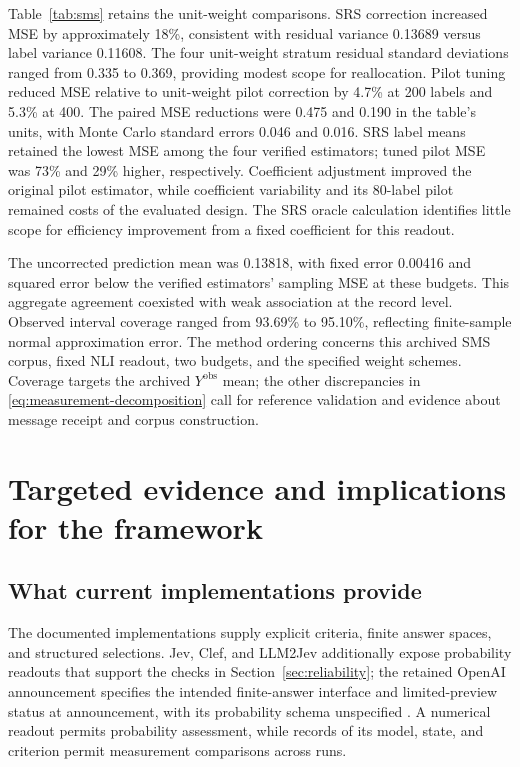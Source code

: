 \documentclass[11pt,a4paper]{article}
\begin{document}
Table~\ref{tab:sms} retains the unit-weight comparisons. SRS correction increased MSE by approximately 18\%, consistent with residual variance 0.13689 versus label variance 0.11608. The four unit-weight stratum residual standard deviations ranged from 0.335 to 0.369, providing modest scope for reallocation. Pilot tuning reduced MSE relative to unit-weight pilot correction by 4.7\% at 200 labels and 5.3\% at 400. The paired MSE reductions were 0.475 and 0.190 in the table's units, with Monte Carlo standard errors 0.046 and 0.016. SRS label means retained the lowest MSE among the four verified estimators; tuned pilot MSE was 73\% and 29\% higher, respectively. Coefficient adjustment improved the original pilot estimator, while coefficient variability and its 80-label pilot remained costs of the evaluated design. The SRS oracle calculation identifies little scope for efficiency improvement from a fixed coefficient for this readout.

The uncorrected prediction mean was 0.13818, with fixed error 0.00416 and squared error below the verified estimators' sampling MSE at these budgets. This aggregate agreement coexisted with weak association at the record level. Observed interval coverage ranged from 93.69\% to 95.10\%, reflecting finite-sample normal approximation error. The method ordering concerns this archived SMS corpus, fixed NLI readout, two budgets, and the specified weight schemes. Coverage targets the archived $Y^{\mathrm{obs}}$ mean; the other discrepancies in \eqref{eq:measurement-decomposition} call for reference validation and evidence about message receipt and corpus construction.

\section{Targeted evidence and implications for the framework}\label{sec:evidence}

\subsection{What current implementations provide}

The documented implementations supply explicit criteria, finite answer spaces, and structured selections. Jev, Clef, and LLM2Jev additionally expose probability readouts that support the checks in Section~\ref{sec:reliability}; the retained OpenAI announcement specifies the intended finite-answer interface and limited-preview status at announcement, with its probability schema unspecified \citep{typesafe-intro,cloudflare2026,liwagle2026,openai2026}. A numerical readout permits probability assessment, while records of its model, state, and criterion permit measurement comparisons across runs.
\end{document}
